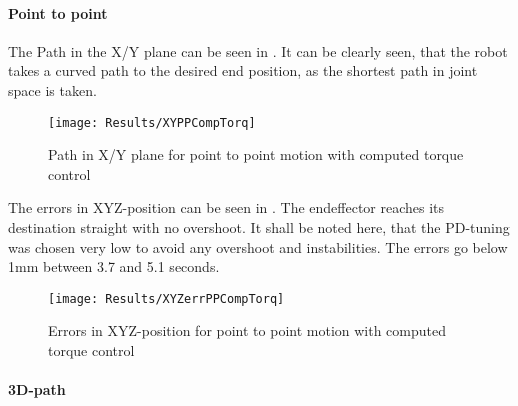 \paragraph{Point to point}
The Path in the X/Y plane can be seen in . 
It can be clearly seen, that the robot takes a curved path to the desired end position, as the shortest path in joint space is taken.
\begin{figure}[H]
	\texttt{[image: Results/XYPPCompTorq]}
	\caption{Path in X/Y plane for point to point motion with computed torque control}
	\label{fig:XYPPCompTorq}
\end{figure}
The errors in XYZ-position can be seen in . %
The endeffector reaches its destination straight with no overshoot. It shall be noted here, that the PD-tuning was chosen very low to avoid any overshoot and instabilities. The errors go below 1mm between 3.7 and 5.1 seconds.
\begin{figure}[H]
	\texttt{[image: Results/XYZerrPPCompTorq]}
	\caption{Errors in XYZ-position for point to point motion with computed torque control}
	\label{fig:XYZerrPPCompTorq}
\end{figure}



\paragraph{3D-path}

